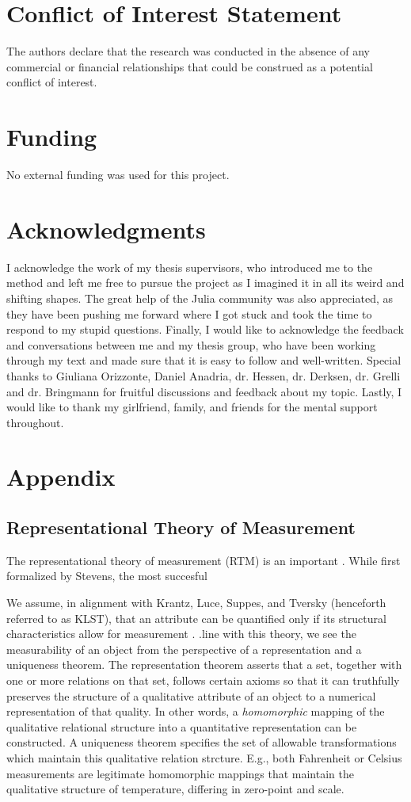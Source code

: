 \documentclass[utf8]{FrontiersinVancouver}
\begin{document}
\section*{Conflict of Interest Statement}
The authors declare that the research was conducted in the absence of any commercial or financial relationships that could be construed as a potential conflict of interest.

\section*{Funding}
No external funding was used for this project.

\section*{Acknowledgments}
I acknowledge the work of my thesis supervisors, who introduced me to the method and left me free to pursue the project as I imagined it in all its weird and shifting shapes.  The great help of the Julia community was also appreciated, as they have been pushing me forward where I got stuck and took the time to respond to my stupid questions. Finally, I would like to acknowledge the feedback and conversations between me and my thesis group, who have been working through my text and made sure that it is easy to follow and well-written. Special thanks to Giuliana Orizzonte, Daniel Anadria, dr. Hessen, dr. Derksen, dr. Grelli and dr. Bringmann for fruitful discussions and feedback about my topic. Lastly, I would like to thank my girlfriend, family, and friends for the mental support throughout.

\section*{Appendix}

\subsection{Representational Theory of Measurement}
The representational theory of measurement (RTM) is an important . While first formalized by Stevens, the most succesful 

We assume, in alignment with Krantz, Luce, Suppes, and Tversky (henceforth referred to as KLST), that an attribute can be quantified only if its structural characteristics allow for measurement \citep{}. .\@In line with this theory, we see the measurability of an object from the perspective of a representation and a uniqueness theorem. The representation theorem asserts that a set, together with one or more relations on that set, follows certain axioms so that it can truthfully preserves the structure of a qualitative attribute of an object to a numerical representation of that quality. In other words, a \textit{homomorphic} mapping of the qualitative relational structure into a quantitative representation can be constructed. A uniqueness theorem specifies the set of allowable transformations which maintain this qualitative relation strcture. E.g., both Fahrenheit or Celsius measurements are legitimate homomorphic mappings that maintain the qualitative structure of temperature, differing in zero-point and scale.  
\end{document}
